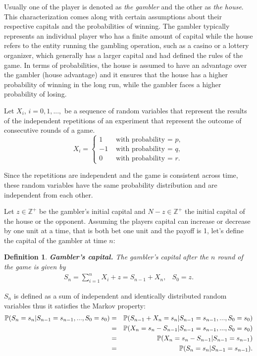 \documentclass[11pt,twoside]{article}
\newtheorem{Definition}{Definition}
\numberwithin{Theorem}{section}
\numberwithin{Definition}{section}
\numberwithin{Lemma}{section}
\numberwithin{Algorithm}{section}
\numberwithin{equation}{section}
\newcommand{\probP}{\mathbb{P}}
\begin{document}
Usually one of the player is denoted as \textit{the gambler} and the other as \textit{the house}. This characterization comes along with certain assumptions about their respective capitals and the probabilities of winning. The gambler typically represents an individual player who has a finite amount of capital while the house refers to the entity running the gambling operation, such as a casino or a lottery organizer, which generally has a larger capital and had defined the rules of the game. In terms of probabilities, the house is assumed to have an advantage over the gambler (house advantage) and it ensures that the house has a higher probability of winning in the long run, while the gambler faces a higher probability of losing. 

Let $X_{i}$, $i = 0, 1, ...,$ be a sequence of random variables that represent the results of the independent repetitions of an experiment that represent the outcome of consecutive rounds of a game. 
\begin{equation}\label{round_outcome}
X_{i} = \left\{
\begin{array}{rl}
1 & \text{ with probability = } p,\\
-1 & \text{ with probability = } q,\\
0 & \text{ with probability = } r.
\end{array}
\right.
\end{equation}

Since the repetitions are independent and the game is consistent across time, these random variables have the same probability distribution and are independent from each other. 

Let $z \in \mathbb Z^+$ be the gambler’s initial capital and $N-z \in \mathbb Z^+$ the initial capital of the house or the opponent. Assuming the players capital can increase or decrease by one unit at a time, that is both bet one unit and the payoff is 1, let's define the capital of the gambler at time $n$:

\begin{Definition}
\textbf{Gambler's capital.} The gambler's capital after the $n$ round of the game is given by
\begin{eqnarray}\label{capital}
S_{n} = \sum_{i = 1}^{n} X_{i} + z = S_{n-1} + X_{n} , &S_{0} = z.
\end{eqnarray}  
\end{Definition}

$S_{n}$ is defined as a sum of independent and identically distributed random variables thus it satisfies the Markov property:
\begin{eqnarray}
\probP{(S_{n} = s_{n}\text{\textbar}S_{n-1} = s_{n-1}, ..., S_{0} = s_{0})} &=&\probP{(S_{n-1} + X_{n} = s_{n}\text{\textbar}S_{n-1} = s_{n-1}, ..., S_{0} = s_{0})} \notag\\
&=&\probP{(X_{n} = s_{n} - S_{n-1} \text{\textbar}S_{n-1} = s_{n-1}, ..., S_{0} = s_{0})} \notag\\
&=&\probP{(X_{n} = s_{n} - S_{n-1} \text{\textbar}S_{n-1} = s_{n-1})} \notag\\
&=&\probP{(S_{n} = s_{n} \text{\textbar}S_{n-1} = s_{n-1})}.\notag
\end{eqnarray}
\end{document}
